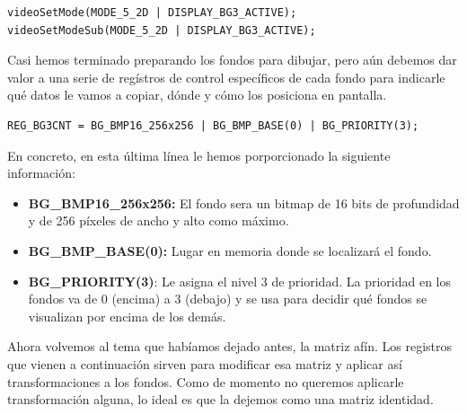 \vspace{0.5cm}

\begin{lstlisting}[caption={Bucle principal del juego}, label={code:gameloop}]
videoSetMode(MODE_5_2D | DISPLAY_BG3_ACTIVE);
videoSetModeSub(MODE_5_2D | DISPLAY_BG3_ACTIVE);
\end{lstlisting}

\vspace{0.5cm}

Casi hemos terminado preparando los fondos para dibujar, pero aún debemos dar valor a una serie de regístros de control específicos de cada fondo para indicarle qué datos le vamos a copiar, dónde y cómo los posiciona en pantalla.

\vspace{0.5cm}

\begin{lstlisting}[caption={Bucle principal del juego}, label={code:gameloop}]
REG_BG3CNT = BG_BMP16_256x256 | BG_BMP_BASE(0) | BG_PRIORITY(3);
\end{lstlisting}

\vspace{0.5cm}

En concreto, en esta última línea le hemos porporcionado la siguiente información:

\vspace{0.5cm}

\begin{itemize}
 \item \textbf{BG\_BMP16\_256x256: } El fondo sera un bitmap de 16 bits de profundidad y de 256 píxeles de ancho y alto como máximo.
  \item \textbf{BG\_BMP\_BASE(0):} Lugar en memoria donde se localizará el fondo.
   \item \textbf{BG\_PRIORITY(3)}: Le asigna el nivel 3 de prioridad. La prioridad en los fondos va de 0 (encima) a 3 (debajo) y se usa para decidir qué fondos se visualizan por encima de los demás.

\end{itemize}

\vspace{0.5cm}

Ahora volvemos al tema que habíamos dejado antes, la matriz afín. Los registros que vienen a continuación sirven para modificar esa matriz y aplicar así transformaciones a los fondos. Como de momento no queremos aplicarle transformación alguna, lo ideal es que la dejemos como una matriz identidad.

